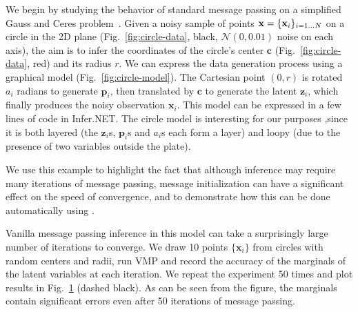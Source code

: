 \begin{figure}[t]
	\centering
	\label{fig:circle-results}
\end{figure}

We begin by studying the behavior of standard message passing on a simplified Gauss and Ceres problem~\citep{Teets1999}.
Given a noisy sample of points $\mathbf{x} = \{ \mathbf{x}_i \}_{i=1...N}$ on a circle in the 2D plane (Fig.~\ref{fig:circle-data}, black, $\mathcal{N}(0,0.01)$ noise on each axis), the aim is to infer the coordinates of the circle's center $\mathbf{c}$ (Fig.~\ref{fig:circle-data}, red) and its radius $r$. We can express the data generation process using a graphical model (Fig.~\ref{fig:circle-model}). The Cartesian point $(0, r)$ is rotated $a_i$ radians to generate $\mathbf{p}_i$, then translated by $\mathbf{c}$ to generate the latent $\mathbf{z}_i$, which finally produces the noisy observation $\mathbf{x}_i$.  This model can be expressed in a few lines of code in Infer.NET. The circle model is interesting for our purposes ,since it is both layered (the $\mathbf{z}_i$s, $\mathbf{p}_i$s and $a_i$s each form a layer) and loopy (due to the presence of two variables outside the plate).

We use this example to highlight the fact that although inference may require many iterations of message passing, message initialization can have a significant effect on the speed of convergence, and to demonstrate how this can be done automatically using \MTD.

Vanilla message passing inference in this model can take a surprisingly large number of iterations to converge. We draw 10 points $\{ \mathbf{x}_i \}$ from circles with random centers and radii, run VMP and record the accuracy of the marginals of the latent variables at each iteration. We repeat the experiment 50 times and plot results in Fig.~\ref{fig:circle-results} (dashed black). As can be seen from the figure, the marginals contain significant errors even after 50 iterations of message passing.

